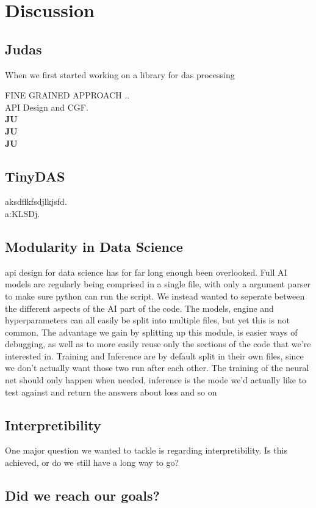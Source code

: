 \section{Discussion}
\label{chap:discussion}

\subsection{Judas}

When we first started working on a library for das processing 

FINE GRAINED APPROACH .. \\

API Design and CGF. \\ 

\textbf{JU} \\ 

\textbf{JU} \\ 

\textbf{JU} \\ 

\subsection{TinyDAS}

aksdflkfsdjlkjsfd. \\ 
a:KLSDj.

\subsection{Modularity in Data Science}

api design for data science has for far long enough been overlooked. Full AI models are regularly being comprised in a single file, with only a argument parser to make sure python can run the script. We instead wanted to seperate between the different aspects of the AI part of the code. The models, engine and hyperparameters can all easily be split into multiple files, but yet this is not common. The advantage we gain by splitting up this module, is easier ways of debugging, as well as to more easily reuse only the sections of the code that we're interested in. Training and Inference are by default split in their own files, since we don't actually want those two run after each other. The training of the neural net should only happen when needed, inference is the mode we'd actually like to test against and return the answers about loss and so on 


\subsection{Interpretibility}
One major question we wanted to tackle is regarding interpretibility. Is this achieved, or do we still have a long way to go?

\subsection{Did we reach our goals?}
